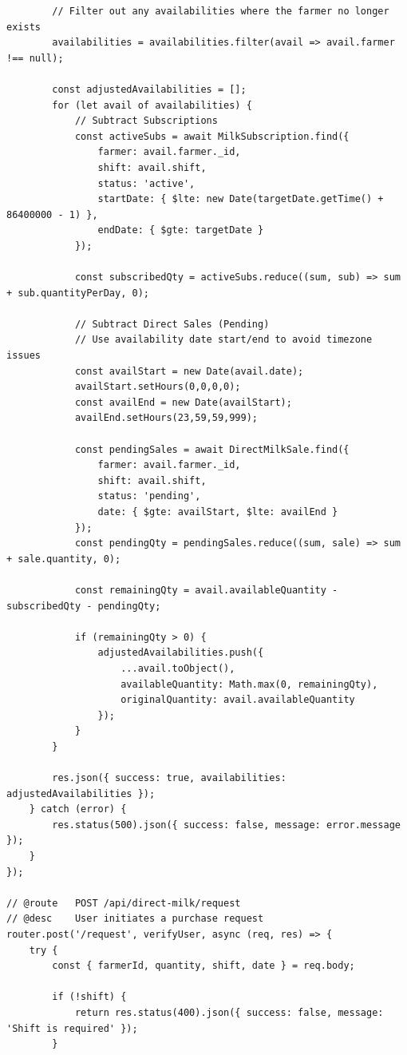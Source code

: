 \documentclass[12pt,a4paper]{report}
\begin{document}
\begin{lstlisting}
        // Filter out any availabilities where the farmer no longer exists
        availabilities = availabilities.filter(avail => avail.farmer !== null);

        const adjustedAvailabilities = [];
        for (let avail of availabilities) {
            // Subtract Subscriptions
            const activeSubs = await MilkSubscription.find({
                farmer: avail.farmer._id,
                shift: avail.shift,
                status: 'active',
                startDate: { $lte: new Date(targetDate.getTime() + 86400000 - 1) },
                endDate: { $gte: targetDate }
            });
            
            const subscribedQty = activeSubs.reduce((sum, sub) => sum + sub.quantityPerDay, 0);

            // Subtract Direct Sales (Pending)
            // Use availability date start/end to avoid timezone issues
            const availStart = new Date(avail.date);
            availStart.setHours(0,0,0,0);
            const availEnd = new Date(availStart);
            availEnd.setHours(23,59,59,999);

            const pendingSales = await DirectMilkSale.find({
                farmer: avail.farmer._id,
                shift: avail.shift,
                status: 'pending',
                date: { $gte: availStart, $lte: availEnd }
            });
            const pendingQty = pendingSales.reduce((sum, sale) => sum + sale.quantity, 0);

            const remainingQty = avail.availableQuantity - subscribedQty - pendingQty;

            if (remainingQty > 0) {
                adjustedAvailabilities.push({
                    ...avail.toObject(),
                    availableQuantity: Math.max(0, remainingQty),
                    originalQuantity: avail.availableQuantity
                });
            }
        }

        res.json({ success: true, availabilities: adjustedAvailabilities });
    } catch (error) {
        res.status(500).json({ success: false, message: error.message });
    }
});

// @route   POST /api/direct-milk/request
// @desc    User initiates a purchase request
router.post('/request', verifyUser, async (req, res) => {
    try {
        const { farmerId, quantity, shift, date } = req.body;

        if (!shift) {
            return res.status(400).json({ success: false, message: 'Shift is required' });
        }


\end{lstlisting}
\end{document}
